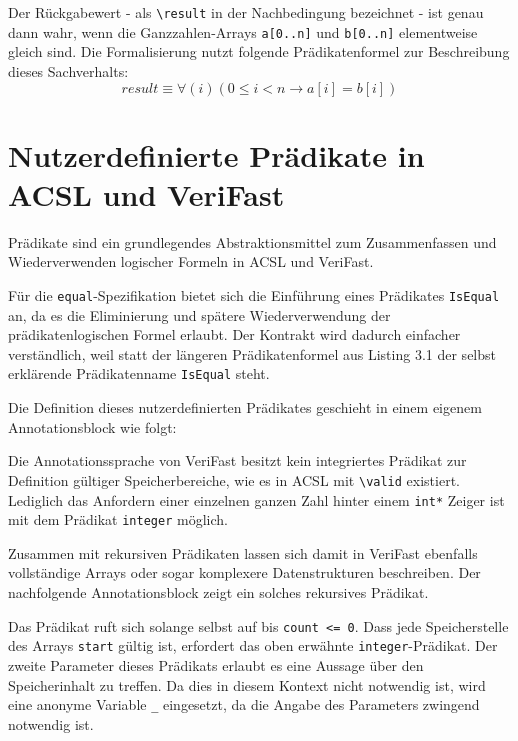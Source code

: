 Der Rückgabewert - als \lstinline{\result} in der Nachbedingung bezeichnet - ist genau dann wahr, wenn die Ganzzahlen-Arrays 
\lstinline{a[0..n]} und \lstinline{b[0..n]} elementweise gleich sind. Die Formalisierung nutzt folgende
Prädikatenformel zur Beschreibung dieses Sachverhalts:
\[result \equiv \forall(i) (0 \leq i < n \rightarrow a[i] = b[i])\]

\section{Nutzerdefinierte Prädikate in ACSL und VeriFast}
\label{sec:design-by-contract:predicates}

Prädikate sind ein grundlegendes Abstraktionsmittel zum Zusammenfassen und Wiederverwenden logischer
Formeln in ACSL und VeriFast.

Für die \texttt{equal}-Spezifikation bietet sich die Einführung eines Prädikates \texttt{IsEqual} an,
da es die Eliminierung und spätere Wiederverwendung der prädikatenlogischen Formel erlaubt. Der Kontrakt
wird dadurch einfacher verständlich, weil statt der längeren Prädikatenformel aus Listing 3.1 der selbst erklärende
Prädikatenname \texttt{IsEqual} steht.



Die Definition dieses nutzerdefinierten Prädikates geschieht in einem eigenem Annotationsblock wie folgt:



Die Annotationssprache von VeriFast besitzt kein integriertes Prädikat zur Definition gültiger Speicherbereiche,
wie es in ACSL mit \lstinline{\valid} existiert. Lediglich das Anfordern einer einzelnen ganzen Zahl hinter
einem \lstinline{int*} Zeiger ist mit dem Prädikat \lstinline{integer} möglich.

Zusammen mit rekursiven Prädikaten lassen sich damit in VeriFast ebenfalls vollständige Arrays oder sogar komplexere
Datenstrukturen beschreiben. Der nachfolgende Annotationsblock zeigt ein solches rekursives Prädikat.



Das Prädikat ruft sich solange selbst auf bis \lstinline{count <= 0}. Dass jede Speicherstelle des Arrays \lstinline{start}
gültig ist, erfordert das oben erwähnte \lstinline{integer}-Prädikat. Der zweite Parameter dieses Prädikats erlaubt es eine
Aussage über den Speicherinhalt zu treffen. Da dies in diesem Kontext nicht notwendig ist, wird eine anonyme Variable
\lstinline{_} eingesetzt, da die Angabe des Parameters zwingend notwendig ist.

